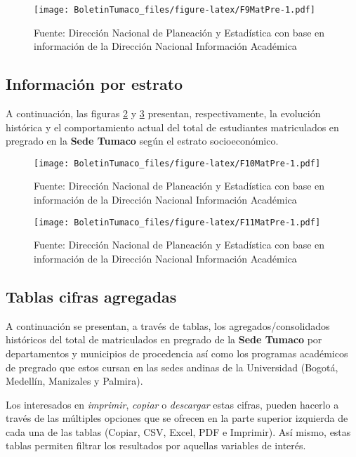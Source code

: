 \documentclass[
]{book}
\begin{document}
\begin{figure}
\centering
\texttt{[image: BoletinTumaco\_files/figure-latex/F9MatPre-1.pdf]}
\caption{\label{fig:F9MatPre}Fuente: Dirección Nacional de Planeación y Estadística con base en información de la Dirección Nacional Información Académica}
\end{figure}

\hypertarget{informaciuxf3n-por-estrato}{%
\subsection{Información por estrato}\label{informaciuxf3n-por-estrato}}

A continuación, las figuras \ref{fig:F10MatPre} y \ref{fig:F11MatPre} presentan, respectivamente, la evolución histórica y el comportamiento actual del total de estudiantes matriculados en pregrado en la \textbf{Sede Tumaco} según el estrato socioeconómico.

\begin{figure}
\centering
\texttt{[image: BoletinTumaco\_files/figure-latex/F10MatPre-1.pdf]}
\caption{\label{fig:F10MatPre}Fuente: Dirección Nacional de Planeación y Estadística con base en información de la Dirección Nacional Información Académica}
\end{figure}

\begin{figure}
\centering
\texttt{[image: BoletinTumaco\_files/figure-latex/F11MatPre-1.pdf]}
\caption{\label{fig:F11MatPre}Fuente: Dirección Nacional de Planeación y Estadística con base en información de la Dirección Nacional Información Académica}
\end{figure}

\hypertarget{tablas-cifras-agregadas-2}{%
\subsection{Tablas cifras agregadas}\label{tablas-cifras-agregadas-2}}

A continuación se presentan, a través de tablas, los agregados/consolidados históricos del total de matriculados en pregrado de la \textbf{Sede Tumaco} por departamentos y municipios de procedencia así como los programas académicos de pregrado que estos cursan en las sedes andinas de la Universidad (Bogotá, Medellín, Manizales y Palmira).

Los interesados en \emph{imprimir}, \emph{copiar} o \emph{descargar} estas cifras, pueden hacerlo a través de las múltiples opciones que se ofrecen en la parte superior izquierda de cada una de las tablas (Copiar, CSV, Excel, PDF e Imprimir). Así mismo, estas tablas permiten filtrar los resultados por aquellas variables de interés.
\end{document}
